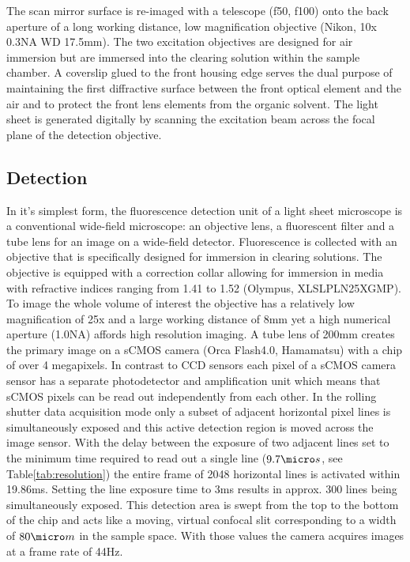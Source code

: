 \documentclass[12pt]{spieman}  %
\begin{document}
The scan mirror surface is re-imaged with a telescope (f50, f100) onto the back aperture of a long working distance, low magnification objective (Nikon, 10x 0.3NA WD 17.5mm). The two excitation objectives are designed for air immersion but are immersed into the clearing solution within the sample chamber. A coverslip glued to the front housing edge serves the dual purpose of maintaining the first diffractive surface between the front optical element and the air and to protect the front lens elements from the organic solvent. The light sheet is generated digitally\cite{Keller2008a,Keller2008b} by scanning the excitation beam across the focal plane of the detection objective. %



	
\subsection{Detection}
		
		
In it's simplest form, the fluorescence detection unit of a light sheet microscope is a conventional wide-field microscope: an objective lens, a fluorescent filter and a tube lens for an image on a wide-field detector. Fluorescence is collected with an objective that is specifically designed for immersion in clearing solutions. The objective is equipped with a correction collar allowing for immersion in media with refractive indices ranging from 1.41 to 1.52 (Olympus, XLSLPLN25XGMP). To image the whole volume of interest the objective has a relatively low magnification of 25x and a large working distance of 8mm yet a high numerical aperture (1.0NA) affords high resolution imaging. A tube lens of 200mm creates the primary image on a sCMOS camera (Orca Flash4.0, Hamamatsu) with a chip of over 4 megapixels. In contrast to CCD sensors each pixel of a sCMOS camera sensor has a separate photodetector and amplification unit which means that sCMOS pixels can be read out independently from each other. In the rolling shutter data acquisition mode only a subset of adjacent horizontal pixel lines is simultaneously exposed and this active detection region is moved across the image sensor. With the delay between the exposure of two adjacent lines set to the minimum time required to read out a single line ($9.7\micro s$, see Table\ref{tab:resolution}) the entire frame of 2048 horizontal lines is activated within 19.86ms. Setting the line exposure time to 3ms results in approx. 300 lines being simultaneously exposed. This detection area is swept from the top to the bottom of the chip and acts like a moving, virtual confocal slit corresponding to a width of $80\micro m$ in the sample space. With those values the camera acquires images at a frame rate of 44Hz. 
\end{document}
